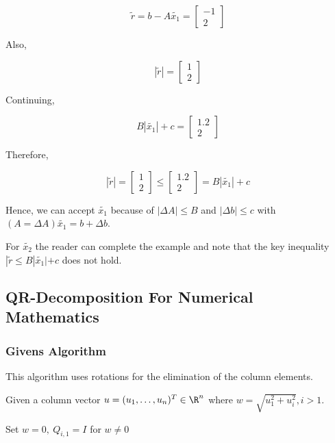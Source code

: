 \[
    \tilde{r} = b - A\tilde{x_1} = 
    \begin{bmatrix}
        -1 \\ 
        2
    \end{bmatrix}
\]

Also, 

\[
    |\tilde{r}| = 
    \begin{bmatrix}
        1 \\ 
        2
    \end{bmatrix}
\]

Continuing, 

\[
    B|\tilde{x_1}| + c = 
    \begin{bmatrix}
        1.2 \\ 
        2
    \end{bmatrix}
\]

Therefore, 

\[
    |\tilde{r}|
    =
    \begin{bmatrix}
        1 \\ 
        2
    \end{bmatrix}
    \le
    \begin{bmatrix}
        1.2 \\ 
        2
    \end{bmatrix}
    = 
    B|\tilde{x_1}| + c
\]

Hence, we can accept \(\tilde{x_1}\) because of \(|\Delta A| \le B\) and \(|\Delta b| \le c\) 
with \((A = \Delta A)\tilde{x_1} = b + \Delta b\).

For \(\tilde{x_2}\) the reader can complete the example and note that the key inequality 
\(|\tilde{r} \le B|\tilde{x_1}| + c\) does not hold.

\subsection{QR-Decomposition For Numerical Mathematics}

\subsubsection{Givens Algorithm}

This algorithm uses rotations for the elimination of the column elements.

Given a column vector \(u = (u_1, \dots, u_n)^T \in \R^n\) where \(w = \sqrt{u_1^2 + u_i^2}, i > 1\). 

Set \(w = 0,\ Q_{i,1} = I\) for \(w \ne 0\)

